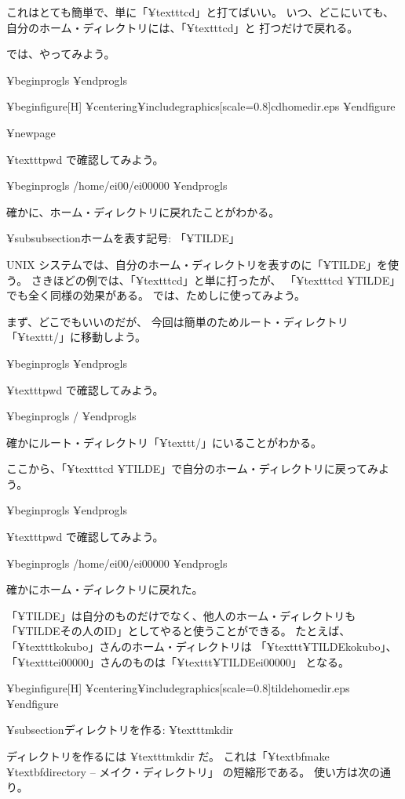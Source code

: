 {これはとても簡単で、単に「¥texttt{cd}」と打てばいい。
いつ、どこにいても、自分のホーム・ディレクトリには、「¥texttt{cd}」と
打つだけで戻れる。

では、やってみよう。

¥begin{progls}
%
¥end{progls}

¥begin{figure}[H]
¥centering{¥includegraphics[scale=0.8]{cdhomedir.eps}}
¥end{figure}

¥newpage

¥texttt{pwd} で確認してみよう。

¥begin{progls}
/home/ei00/ei00000
%
¥end{progls}

確かに、ホーム・ディレクトリに戻れたことがわかる。

¥subsubsection{ホームを表す記号: 「¥TILDE」}

UNIX システムでは、自分のホーム・ディレクトリを表すのに「¥TILDE」を使う。
さきほどの例では、「¥texttt{cd}」と単に打ったが、
「¥texttt{cd ¥TILDE}」でも全く同様の効果がある。
では、ためしに使ってみよう。

まず、どこでもいいのだが、
今回は簡単のためルート・ディレクトリ「¥texttt{/}」に移動しよう。

¥begin{progls}
%
¥end{progls}

¥texttt{pwd} で確認してみよう。

¥begin{progls}
/
%
¥end{progls}

確かにルート・ディレクトリ「¥texttt{/}」にいることがわかる。

ここから、「¥texttt{cd ¥TILDE}」で自分のホーム・ディレクトリに戻ってみよう。

¥begin{progls}
%
¥end{progls}

¥texttt{pwd} で確認してみよう。

¥begin{progls}
/home/ei00/ei00000
%
¥end{progls}

確かにホーム・ディレクトリに戻れた。

「¥TILDE」は自分のものだけでなく、他人のホーム・ディレクトリも
「{¥TILDE}その人のID」としてやると使うことができる。
たとえば、「¥texttt{kokubo}」さんのホーム・ディレクトリは
「¥texttt{{¥TILDE}kokubo}」、
「¥texttt{ei00000}」さんのものは「¥texttt{{¥TILDE}ei00000}」
となる。

¥begin{figure}[H]
¥centering{¥includegraphics[scale=0.8]{tildehomedir.eps}}
¥end{figure}

¥subsection{ディレクトリを作る: ¥texttt{mkdir}}

ディレクトリを作るには ¥texttt{mkdir} だ。
これは「¥textbf{m}ake ¥textbf{dir}ectory -- メイク・ディレクトリ」
の短縮形である。
使い方は次の通り。

}
